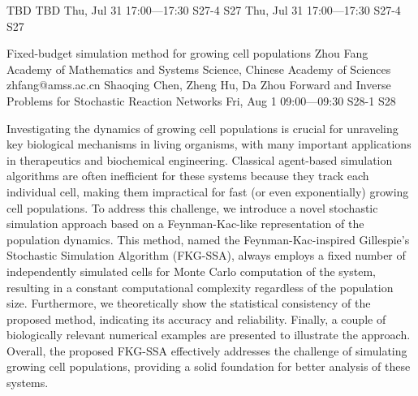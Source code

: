 \begin{talk}
  {TBD}%
  {TBD}%
  {Thu, Jul 31 17:00---17:30}%
  {S27-4}%
  {S27}%
  {}%
  {Thu, Jul 31 17:00---17:30}%
  {S27-4}%
  {S27}%
\end{talk}

\begin{talk}
  {Fixed-budget simulation method for growing cell populations}%
  {Zhou Fang}%
  {Academy of Mathematics and Systems Science, Chinese Academy of Sciences}%
  {zhfang@amss.ac.cn}%
  {Shaoqing Chen, Zheng Hu, Da Zhou}%
  {Forward and Inverse Problems for Stochastic Reaction Networks}%
  {Fri, Aug 1 09:00---09:30}%
  {S28-1}%
  {S28}%
    
   
Investigating the dynamics of growing cell populations is crucial for unraveling key biological mechanisms in living organisms, with many important applications in therapeutics and biochemical engineering. Classical agent-based simulation algorithms are often inefficient for these systems because
they track each individual cell, making them impractical for fast (or even exponentially) growing
cell populations. To address this challenge, we introduce a novel stochastic simulation approach
based on a Feynman-Kac-like representation of the population dynamics. This method, named the
Feynman-Kac-inspired Gillespie’s Stochastic Simulation Algorithm (FKG-SSA), always employs a
fixed number of independently simulated cells for Monte Carlo computation of the system, resulting in a constant computational complexity regardless of the population size. Furthermore, we
theoretically show the statistical consistency of the proposed method, indicating its accuracy and
reliability. Finally, a couple of biologically relevant numerical examples are presented to illustrate the
approach. Overall, the proposed FKG-SSA effectively addresses the challenge of simulating growing
cell populations, providing a solid foundation for better analysis of these systems.


\end{talk}

